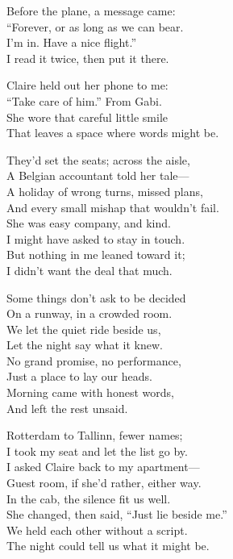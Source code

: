 \begin{lyrics}
Before the plane, a message came:\\
“Forever, or as long as we can bear.\\
I’m in. Have a nice flight.”\\
I read it twice, then put it there.

Claire held out her phone to me:\\
“Take care of him.” From Gabi.\\
She wore that careful little smile\\
That leaves a space where words might be.

They’d set the seats; across the aisle,\\
A Belgian accountant told her tale—\\
A holiday of wrong turns, missed plans,\\
And every small mishap that wouldn’t fail.\\
She was easy company, and kind.\\
I might have asked to stay in touch.\\
But nothing in me leaned toward it;\\
I didn’t want the deal that much.

Some things don’t ask to be decided\\
On a runway, in a crowded room.\\
We let the quiet ride beside us,\\
Let the night say what it knew.\\
No grand promise, no performance,\\
Just a place to lay our heads.\\
Morning came with honest words,\\
And left the rest unsaid.

Rotterdam to Tallinn, fewer names;\\
I took my seat and let the list go by.\\
I asked Claire back to my apartment—\\
Guest room, if she’d rather, either way.\\
In the cab, the silence fit us well.\\
She changed, then said, “Just lie beside me.”\\
We held each other without a script.\\
The night could tell us what it might be.


\end{lyrics}
